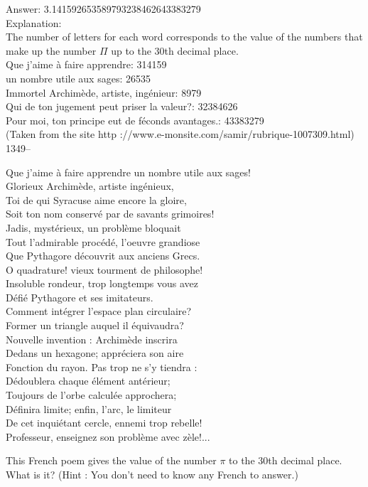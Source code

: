 \documentclass[letterpaper, 12pt]{article}
\begin{document}
Answer: 3.141592653589793238462643383279\\

Explanation: \\
The number of letters for each word corresponds to the value of the numbers that make up the number $\Pi$ up to the 30th decimal place.\\

Que j'aime \`a faire apprendre: 314159\\
un nombre utile aux sages: 26535\\
Immortel Archim\`ede, artiste, ing\'enieur: 8979\\
Qui de ton jugement peut priser la valeur?: 32384626\\
Pour moi, ton principe eut de f\'econds avantages.: 43383279\\
(Taken from the site http ://www.e-monsite.com/samir/rubrique-1007309.html)\\


1349--\begin{center}{Que j'aime \`a faire apprendre un nombre utile aux
sages! \\
Glorieux Archim\`ede, artiste ing\'enieux,\\
Toi de qui Syracuse aime encore la gloire,\\
Soit ton nom conserv\'e par de savants grimoires! \\
Jadis, myst\'erieux, un probl\`eme bloquait \\
Tout l'admirable proc\'ed\'e, l'oeuvre grandiose\\
Que Pythagore d\'ecouvrit aux anciens Grecs. \\
O quadrature! vieux tourment de philosophe!\\
Insoluble rondeur, trop longtemps vous avez \\
D\'efi\'e Pythagore et ses imitateurs. \\
Comment int\'egrer l'espace plan circulaire?\\
Former un triangle auquel il \'equivaudra? \\
Nouvelle invention : Archim\`ede inscrira \\
Dedans un hexagone; appr\'eciera son aire \\
Fonction du rayon. Pas trop ne s'y tiendra :\\
D\'edoublera chaque \'el\'ement ant\'erieur; \\
Toujours de l'orbe calcul\'ee approchera;\\
D\'efinira limite; enfin, l'arc, le limiteur\\
De cet inqui\'etant cercle, ennemi trop rebelle!\\
Professeur, enseignez son probl\`eme avec z\`ele!...\\}
\end{center}
This French poem gives the value of the number $\pi$ to the 30th decimal place. What is it? (Hint : You don't need to know any French to answer.)\\
\end{document}
